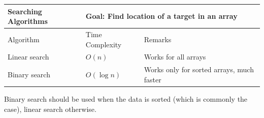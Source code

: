 \begin{table}[h]
    \centering
    \begin{tabular}{|m{6em}|m{9em}|m{18em}|}
        \hline  
        \textbf{Searching Algorithms} & 
        \multicolumn{2}{l|}{Goal: Find location of a target in an array}
        \\ \hline \hline
        
        Algorithm &
        Time Complexity & 
        Remarks
        \\ \hline \hline
        
        Linear search &
        $O(n)$ &
        Works for all arrays
        \\ \hline
        
        Binary search &
        $O(\log n)$ &
        Works only for sorted arrays, much faster
        \\ \hline
    \end{tabular}
\end{table}

Binary search should be used when the data is sorted (which is commonly the case), linear search otherwise.